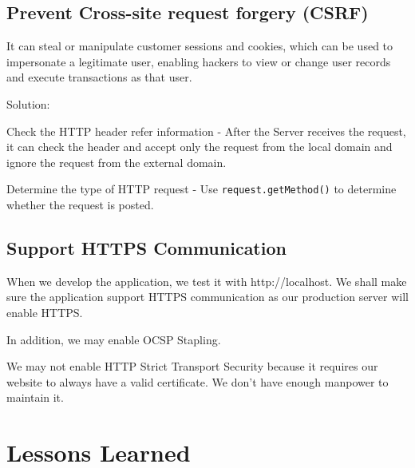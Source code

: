 \documentclass[12pt, a4paper]{article}
\newcommand{\code}[1]{\texttt{#1}}
\begin{document}
\subsection{Prevent Cross-site request forgery (CSRF)}
It can steal or manipulate customer sessions and cookies, which can be used to impersonate a legitimate user, enabling hackers to view or change user records and execute transactions as that user.

Solution: 

Check the HTTP header refer information - After the Server receives the request, it can check the header and accept only the request from the local domain and ignore the request from the external domain.

Determine the type of HTTP request - Use \code{request.getMethod()} to determine whether the request is posted.

\subsection{Support HTTPS Communication}
When we develop the application, we test it with http://localhost. We shall make sure the application support HTTPS communication as our production server will enable HTTPS. 

In addition, we may enable OCSP Stapling. %

We may not enable HTTP Strict Transport Security because it requires our website to always have a valid certificate. We don't have enough manpower to maintain it.

\section{Lessons Learned}
\end{document}
